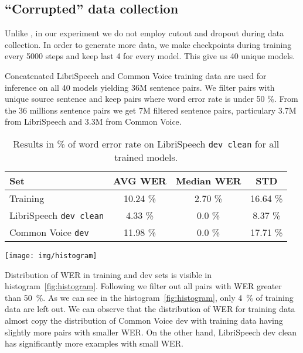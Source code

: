 \subsection{``Corrupted'' data collection}
Unlike , in our experiment we do not employ cutout and dropout during data collection. In order to generate more data, we make checkpoints during training every 5000 steps and keep last 4 for every model. This give us 40 unique models.

Concatenated LibriSpeech and Common Voice training data are used for inference on all 40 models yielding 36M sentence pairs. We filter pairs with unique source sentence and keep pairs where word error rate is under 50 \%. From the 36 millions sentence pairs we get 7M filtered sentence pairs, particulary 3.7M from LibriSpeech and 3.3M from Common Voice.

\begin{table}[t]
		\centering
		\small
		\begin{tabular}{l|ccc}
			\bf Set & \bf AVG WER & \bf Median WER & \bf STD   \\
			\hline 
			Training &  10.24 \% & 2.70 \% & 16.64 \% \\
			LibriSpeech \texttt{dev clean} &  4.33 \% & 0.0 \% & 8.37 \% \\
			Common Voice \texttt{dev} &  11.98 \% & 0.0 \% & 17.71 \% \\
		\end{tabular}
		\caption{Results in \% of word error rate on LibriSpeech \texttt{dev clean} for all trained models.}
		\label{tab:eng_corrupted_table}
\end{table}

\begin{figure*}[t]
		\texttt{[image: img/histogram]}
		\caption{Evaluation on test set during training of 10 models.}
		\label{fig:histogram}
\end{figure*}

Distribution of WER in training and dev sets is visible in histogram~\ref{fig:histogram}. Following  we filter out all pairs with WER greater than 50~\%. As we can see in the histogram~\ref{fig:histogram}, only 4~\% of training data are left out. We can observe that the distribution of WER for training data almost copy the distribution of Common Voice dev with training data having slightly more pairs with smaller WER. On the other hand, LibriSpeech dev clean has significantly more examples with small WER.


